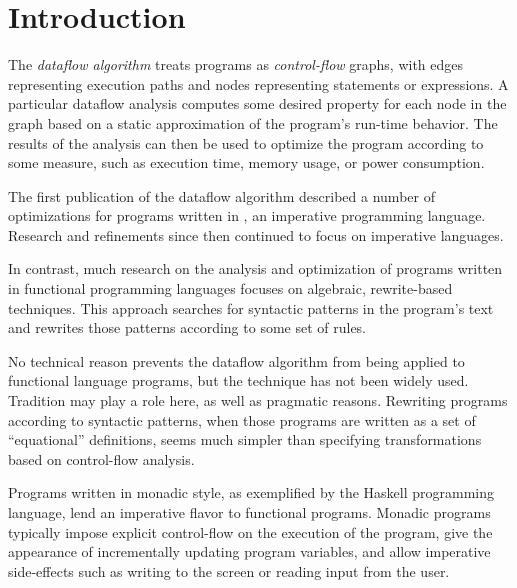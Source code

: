 \dodocclass



\chapter{Introduction}

The \emph{dataflow algorithm} treats programs as \emph{control-flow}
graphs, with edges representing execution paths and nodes representing
statements or expressions. A particular dataflow analysis computes
some desired property for each node in the graph based on a static
approximation of the program's run-time behavior. The results of the
analysis can then be used to optimize the program according to some
measure, such as execution time, memory usage, or power
consumption. 

The first publication of the dataflow algorithm \citep{Kildall1973}
described a number of optimizations for programs written in \algol, an
imperative programming language. Research and refinements since then
continued to focus on imperative languages.

 In
contrast, much research on the analysis and optimization of programs
written in functional programming languages focuses on algebraic,
rewrite-based techniques. This approach searches for syntactic
patterns in the program's text and rewrites those patterns according
to some set of rules.

No technical reason prevents the dataflow algorithm from being applied
to functional language programs, but the technique has not been widely
used. Tradition may play a role here, as well as pragmatic
reasons. Rewriting programs according to syntactic patterns, when
those programs are written as a set of ``equational'' definitions, seems much
simpler than specifying transformations based on control-flow
analysis. 

Programs written in monadic style, as exemplified by the Haskell
programming language, lend an imperative flavor to functional
programs. Monadic programs typically impose explicit control-flow on
the execution of the program, give the appearance of incrementally
updating program variables, and allow imperative side-effects such as
writing to the screen or reading input from the user.

